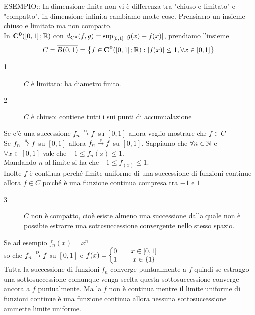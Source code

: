ESEMPIO:: In dimensione finita non vi è differenza tra "chiuso e limitato" e "compatto", in dimensione infinita cambiamo molte cose.
Prensiamo un insieme chiuso e limitato ma non compatto.\\
In $\mathbf{C^{0}}(\left[0,1\right]; \mathbb{R})$ con $d_{\mathbf{C^{0}}}(f,g)=\sup_{\left[0,1\right]}\left|g(x)-f(x)\right|$, prendiamo l'insieme
\[C=\overline{B(0,1)}=\left\{f\in \mathbf{C^{0}}(\left[0,1\right]; \mathbb{R}):\left|f(x)\right| \leq 1, \forall x \in\left[0,1\right]\right\}\]
\begin{description}
	\item[1] $C$ è limitato: ha diametro finito.
	\item[2] $C$ è chiuso: contiene tutti i sui punti di accumualazione
\end{description}
Se c'è una successione $f_n \overset{\text{u}}{\to} f$ su $\left[0,1\right]$ allora voglio mostrare che $f\in C$\\
Se $f_n \overset{\text{u}}{\to} f$ su $\left[0,1\right]$ allora $f_n \overset{\text{p}}{\to} f$ su $\left[0,1\right]$.
Sappiamo che $\forall n\in\mathbb{N}$ e $\forall x\in \left[0,1\right]$ vale che $-1 \leq f_n(x) \leq 1$.\\
Mandando $n$ al limite si ha che $-1 \leq f_(x) \leq 1$.\\
Inolte $f$ è continua perché limite uniforme di una successione di funzioni continue allora $f\in C$ poiché è una funzione continua compresa tra $-1$ e $1$
\begin{description}
	\item[3] $C$ non è compatto, cioè esiste almeno una successione dalla quale non è possibie estrarre una sottosuccessione convergente nello stesso spazio.
\end{description}
Se ad esempio $f_n(x) = x^n$\\
so che $f_n \overset{\text{p}}{\to} f$ su $\left[0,1\right]$ e $f(x)=\left\{\begin{matrix}0&&x\in\left[0,1\right]\\1&&x\in\left\{1\right\}\end{matrix}\right.$\\
Tutta la successione di funzioni $f_n$ converge puntualmente a $f$ quindi se estraggo una sottosuccessione comunque venga scelta questa sottosuccessione converge ancora a $f$ puntualmente. Ma la $f$ non è continua mentre il limite uniforme di funzioni continue è una funzione continua allora nessuna sottosuccessione ammette limite uniforme.

